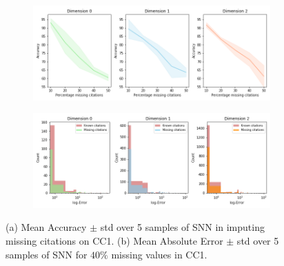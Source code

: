 \begin{figure}[tb]
\centering
 \begin{subfigure}[t]{-0.8\textwidth}
 \vspace{-4cm}
  \end{subfigure}
\begin{subfigure}[t]{0.8\textwidth}
\centering
   \includegraphics[scale=0.35]{./figures/accuracy_network1.png}
\end{subfigure}
 \begin{subfigure}[t]{0.8\textwidth}
  \end{subfigure}
\begin{subfigure}[t]{0.8\textwidth}
\centering
\vspace{-0.5cm}
   \includegraphics[scale=0.36]{./figures/Error_dist_start150250_seed6666_notsee40.png}
\end{subfigure}
\caption{(a) Mean Accuracy $\pm$ std over 5 samples of SNN in imputing missing citations on CC1. (b) Mean Absolute Error $\pm$ std over 5 samples of SNN for $40\%$ missing values in CC1.   }
\label{fig:accuracy-error}
\end{figure}

